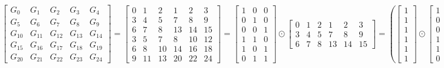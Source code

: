 \documentclass{article}%
\begin{document}
\[%
\left[\begin{matrix}G_{0} & G_{1} & G_{2} & G_{3} & G_{4}\\G_{5} & G_{6} & G_{7} & G_{8} & G_{9}\\G_{10} & G_{11} & G_{12} & G_{13} & G_{14}\\G_{15} & G_{16} & G_{17} & G_{18} & G_{19}\\G_{20} & G_{21} & G_{22} & G_{23} & G_{24}\end{matrix}\right] = \left[\begin{matrix}0 & 1 & 2 & 1 & 2 & 3\\3 & 4 & 5 & 7 & 8 & 9\\6 & 7 & 8 & 13 & 14 & 15\\3 & 5 & 7 & 8 & 10 & 12\\6 & 8 & 10 & 14 & 16 & 18\\9 & 11 & 13 & 20 & 22 & 24\end{matrix}\right] = \left[\begin{matrix}1 & 0 & 0\\0 & 1 & 0\\0 & 0 & 1\\1 & 1 & 0\\1 & 0 & 1\\0 & 1 & 1\end{matrix}\right] \odot \left[\begin{matrix}0 & 1 & 2 & 1 & 2 & 3\\3 & 4 & 5 & 7 & 8 & 9\\6 & 7 & 8 & 13 & 14 & 15\end{matrix}\right] = \left( \left[\begin{matrix}1\\1\\1\\1\\1\\1\end{matrix}\right] \odot \left[\begin{matrix}1 & 0 & 0\\0 & 1 & 0\\0 & 0 & 1\\1 & 1 & 0\\1 & 0 & 1\\0 & 1 & 1\end{matrix}\right] \right) \left[\begin{matrix}\gamma_{0} & \gamma_{1} & \gamma_{2} & \gamma_{3} & \gamma_{4} & \gamma_{5}\\\gamma_{6} & \gamma_{7} & \gamma_{8} & \gamma_{9} & \gamma_{10} & \gamma_{11}\\\gamma_{12} & \gamma_{13} & \gamma_{14} & \gamma_{15} & \gamma_{16} & \gamma_{17}\end{matrix}\right]%
\]%
\end{document}
